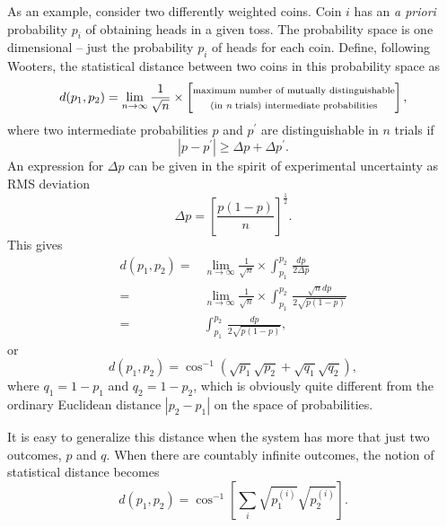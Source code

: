 As an example, consider two differently weighted coins.  Coin $i$ has
an {\it a priori} probability $p_i$ of obtaining heads in a given toss.
The probability space is one dimensional -- just the probability 
$p_i$ of heads for each coin.
Define, following Wooters\cite{Wooters:81},
the statistical distance between two coins in this probability space as
\begin{equation}
d(p_1,p_2) = \lim_{n\to\infty} \frac{1}{\sqrt{n}}\times
    \left[\begin{matrix}
        \text{\scriptsize maximum number of mutually distinguishable}\\
        \text{\scriptsize (in {\it n} trials) intermediate probabilities}
    \end{matrix}\right],
\label{e:ClassicalDistance}
\end{equation}
where two intermediate probabilities $p$ and $p^\prime$ are distinguishable
in $n$ trials if 
\begin{equation}
\left| p-p^\prime \right| \ge \Delta p + \Delta p^\prime.
\end{equation}
An expression for $\Delta p$ can be given in the spirit of experimental
uncertainty as RMS deviation
\begin{equation}
\Delta p = \left[ \frac{p(1-p)}{n} \right]^\frac{1}{2}.
\end{equation}
This gives 
\begin{equation}
\begin{split}
d(p_1,p_2) =& \lim_{n\to\infty} \frac{1}{\sqrt{n}}\times
\int_{p_1}^{p_2}\,\frac{dp}{2\Delta p}\\
=& \lim_{n\to\infty} \frac{1}{\sqrt{n}}\times
\int_{p_1}^{p_2}\,\frac{\sqrt{n}dp}{2\sqrt{p(1-p)}}\\
=& \int_{p_1}^{p_2}\,\frac{dp}{2\sqrt{p(1-p)}},
\end{split}
\end{equation}
or
\begin{equation}
d(p_1,p_2) = \cos^{-1}\left( 
    \sqrt{p_1} \sqrt{p_2} 
    +\sqrt{q_1}\sqrt{q_2}
\right),
\end{equation}
where $q_1 = 1-p_1$ and $q_2=1-p_2$,  
which is obviously quite different from the ordinary Euclidean distance 
$\left| p_2 - p_1 \right|$ on the space of probabilities.

It is easy to generalize this distance when the system has 
more that just two outcomes, $p$ and $q$.
When there are countably infinite outcomes, the notion of statistical
distance becomes
\begin{equation}
d(p_1,p_2) = \cos^{-1}\left\lbrack 
    \sum_{i}
    \sqrt{p^{(i)}_1} \sqrt{p^{(i)}_2} 
\right\rbrack.
\end{equation}


